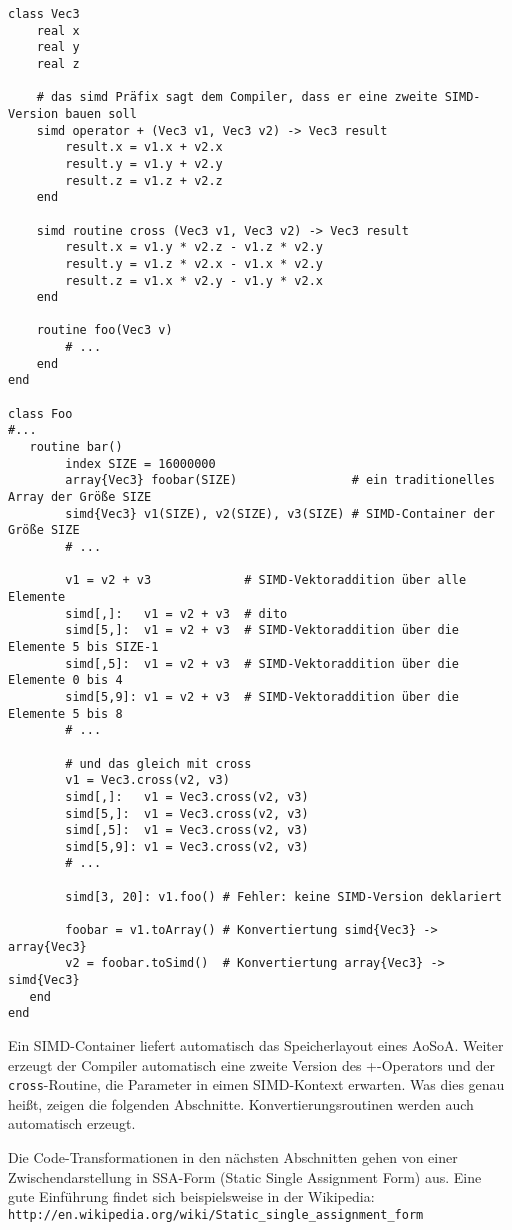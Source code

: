 \documentclass[a4paper,10pt]{article}
\begin{document}
\begin{verbatim}
class Vec3
    real x
    real y
    real z

    # das simd Präfix sagt dem Compiler, dass er eine zweite SIMD-Version bauen soll
    simd operator + (Vec3 v1, Vec3 v2) -> Vec3 result
        result.x = v1.x + v2.x
        result.y = v1.y + v2.y
        result.z = v1.z + v2.z
    end

    simd routine cross (Vec3 v1, Vec3 v2) -> Vec3 result
        result.x = v1.y * v2.z - v1.z * v2.y
        result.y = v1.z * v2.x - v1.x * v2.y
        result.z = v1.x * v2.y - v1.y * v2.x
    end

    routine foo(Vec3 v)
        # ...
    end
end

class Foo
#...
   routine bar()
        index SIZE = 16000000
        array{Vec3} foobar(SIZE)                # ein traditionelles Array der Größe SIZE
        simd{Vec3} v1(SIZE), v2(SIZE), v3(SIZE) # SIMD-Container der Größe SIZE
        # ...

        v1 = v2 + v3             # SIMD-Vektoraddition über alle Elemente
        simd[,]:   v1 = v2 + v3  # dito
        simd[5,]:  v1 = v2 + v3  # SIMD-Vektoraddition über die Elemente 5 bis SIZE-1
        simd[,5]:  v1 = v2 + v3  # SIMD-Vektoraddition über die Elemente 0 bis 4
        simd[5,9]: v1 = v2 + v3  # SIMD-Vektoraddition über die Elemente 5 bis 8
        # ...

        # und das gleich mit cross
        v1 = Vec3.cross(v2, v3)
        simd[,]:   v1 = Vec3.cross(v2, v3)
        simd[5,]:  v1 = Vec3.cross(v2, v3)
        simd[,5]:  v1 = Vec3.cross(v2, v3)
        simd[5,9]: v1 = Vec3.cross(v2, v3)
        # ...

        simd[3, 20]: v1.foo() # Fehler: keine SIMD-Version deklariert

        foobar = v1.toArray() # Konvertiertung simd{Vec3} -> array{Vec3}
        v2 = foobar.toSimd()  # Konvertiertung array{Vec3} -> simd{Vec3}
   end
end
\end{verbatim}

Ein SIMD-Container liefert automatisch das Speicherlayout eines AoSoA. Weiter erzeugt der Compiler
automatisch eine zweite Version des +-Operators und der \texttt{cross}-Routine, die Parameter in
eimen SIMD-Kontext erwarten. Was dies genau heißt, zeigen die folgenden Abschnitte.
Konvertierungsroutinen werden auch automatisch erzeugt.

Die Code-Transformationen in den nächsten Abschnitten gehen von einer Zwischendarstellung in
SSA-Form (Static Single Assignment Form) aus. Eine gute Einführung findet sich beispielsweise in der
Wikipedia: \texttt{http://en.wikipedia.org/wiki/Static\_single\_assignment\_form}
\end{document}
